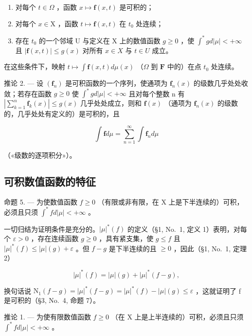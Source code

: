 \begin{enumerate}
\def\labelenumi{\alph{enumi})}
\item
  对每个 \(t \in \Omega\) ，函数 \(x \mapsto \mathbf{f}(x, t)\) 是可积的；
\item
  对每个 \(x \in \mathrm{X}\) ，函数 \(t \mapsto \mathbf{f}(x, t)\) 在 \(t_0\) 处连续；
\item
  存在 \(t_0\) 的一个邻域 U 与定义在 X 上的数值函数 \(g \geqslant 0\) ，使 \(\int^{*} g d|\mu| < +\infty\) 且 \(|\mathbf{f}(x,t)| \leqslant g(x)\) 对所有 \(x \in X\) 与 \(t \in U\) 成立。
\end{enumerate}

在这些条件下，映射 \(t \mapsto \int \mathbf{f}(x,t) d\mu(x)\) （\(\Omega\) 到 \(\mathbf{F}\) 中的）在点 \(t_0\) 处连续。

推论 2. --- 设 \((\mathbf{f}_{n})\) 是可积函数的一个序列，使通项为 \(\mathbf{f}_{n}(x)\) 的级数几乎处处收敛；若存在函数 \(g \geqslant 0\) 使 \(\int^{*} g d|\mu| < +\infty\) 且对每个整数 n 有 \(\left|\sum_{k=1}^{n} \mathbf{f}_{k}(x)\right| \leqslant g(x)\) 几乎处处成立，则和 \(\mathbf{f}(x)\) （通项为 \(\mathbf{f}_{n}(x)\) 的级数的，几乎处处有定义的）是可积的，且

\[
\int \mathbf {f} d \mu = \sum_ {n = 1} ^ {\infty} \int \mathbf {f} _ {n} d \mu\tag{12}
\]

（«级数的逐项积分»）。

\subsection{可积数值函数的特征}

命题 5. --- 为使数值函数 \(f \geqslant 0\) （有限或非有限，在 X 上是下半连续的）可积，必须且只须 \(\int^{*} f d|\mu| < +\infty\) 。

一切归结为证明条件是充分的。\(|\mu|^*(f)\) 的定义（§1, No.~1, 定义 1）表明，对每个 \(\varepsilon > 0\) ，存在连续函数 \(g \geqslant 0\) ，具有紧支集，使 \(g \leqslant f\) 且 \(|\mu|^*(f) \leqslant |\mu|(g) + \varepsilon\) 。但 \(f - g\) 是下半连续的且 \(\geqslant 0\) ，因此（§1, No.~1, 定理 2）

\[
| \mu | ^ {*} (f) = | \mu | (g) + | \mu | ^ {*} (f - g),
\]

换句话说 \(\mathrm{N}_{1}(f-g)=|\mu|^{*}(f-g)=|\mu|^{*}(f)-|\mu|(g)\leqslant\varepsilon\) ，这就证明了 f 是可积的（§3, No.~4, 命题 7）。

推论 1. --- 为使有限数值函数 \(f \geqslant 0\) （在 X 上是上半连续的）可积，必须且只须 \(\int^{*} f d|\mu| < +\infty\) 。

